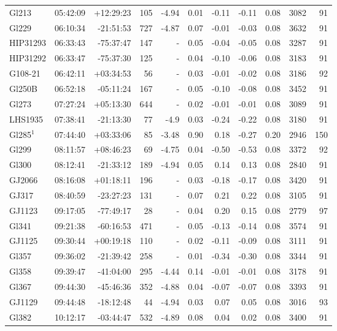 \documentclass{aa}
\begin{document}
{\begin{longtable}{l r r r r r r r r r r}
Gl213 & 05:42:09 & +12:29:23 & 105 & -4.94 & 0.01 & -0.11 & -0.11 & 0.08 & 3082 &   91 \\
Gl229 & 06:10:34 & -21:51:53 & 727 & -4.87 & 0.07 & -0.01 & -0.03 & 0.08 & 3632 &   91 \\
HIP31293 & 06:33:43 & -75:37:47 & 147 &    - & 0.05 & -0.04 & -0.05 & 0.08 & 3287 &   91 \\
HIP31292 & 06:33:47 & -75:37:30 & 125 &    - & 0.04 & -0.10 & -0.06 & 0.08 & 3183 &   91 \\
G108-21 & 06:42:11 & +03:34:53 & 56 &    - & 0.03 & -0.01 & -0.02 & 0.08 & 3186 &   92 \\
Gl250B & 06:52:18 & -05:11:24 & 167 &    - & 0.05 & -0.10 & -0.08 & 0.08 & 3452 &   91 \\
Gl273 & 07:27:24 & +05:13:30 & 644 &    - & 0.02 & -0.01 & -0.01 & 0.08 & 3089 &   91 \\
LHS1935 & 07:38:41 & -21:13:30 & 77 & -4.9 & 0.03 & -0.24 & -0.22 & 0.08 & 3180 &   91 \\
Gl285$^1$ & 07:44:40 & +03:33:06 & 85 & -3.48 & 0.90 & 0.18 & -0.27 & 0.20 & 2946 &  150 \\
Gl299 & 08:11:57 & +08:46:23 & 69 & -4.75 & 0.04 & -0.50 & -0.53 & 0.08 & 3372 &   92 \\
Gl300 & 08:12:41 & -21:33:12 & 189 & -4.94 & 0.05 & 0.14 & 0.13 & 0.08 & 2840 &   91 \\
GJ2066 & 08:16:08 & +01:18:11 & 196 &    - & 0.03 & -0.18 & -0.17 & 0.08 & 3420 &   91 \\
GJ317 & 08:40:59 & -23:27:23 & 131 &    - & 0.07 & 0.21 & 0.22 & 0.08 & 3105 &   91 \\
GJ1123 & 09:17:05 & -77:49:17 & 28 &    - & 0.04 & 0.20 & 0.15 & 0.08 & 2779 &   97 \\
Gl341 & 09:21:38 & -60:16:53 & 471 &    - & 0.05 & -0.13 & -0.14 & 0.08 & 3574 &   91 \\
GJ1125 & 09:30:44 & +00:19:18 & 110 &    - & 0.02 & -0.11 & -0.09 & 0.08 & 3111 &   91 \\
Gl357 & 09:36:02 & -21:39:42 & 258 &    - & 0.01 & -0.34 & -0.30 & 0.08 & 3344 &   91 \\
Gl358 & 09:39:47 & -41:04:00 & 295 & -4.44 & 0.14 & -0.01 & -0.01 & 0.08 & 3178 &   91 \\
Gl367 & 09:44:30 & -45:46:36 & 352 & -4.88 & 0.04 & -0.07 & -0.07 & 0.08 & 3393 &   91 \\
GJ1129 & 09:44:48 & -18:12:48 & 44 & -4.94 & 0.03 & 0.07 & 0.05 & 0.08 & 3016 &   93 \\
Gl382 & 10:12:17 & -03:44:47 & 532 & -4.89 & 0.08 & 0.04 & 0.02 & 0.08 & 3400 &   91 \\

\end{longtable}}
\end{document}
